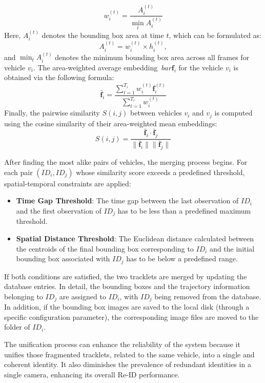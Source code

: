 \begin{itemize}
    \[
        w_{i}^{(t)} = \frac{A_{i}^{(t)}}{\min\limits_{t} A_{i}^{(t)}}
    \]
    Here, \( A_{i}^{(t)} \) denotes the bounding box area at time \( t \), which can be formulated as:
    \[
        A_{i}^{(t)} = w_{i}^{(t)} \times h_{i}^{(t)},
    \]
    and \( \min_{t} A_{i}^{(t)} \) denotes the minimum bounding box area across all frames for vehicle \( v_i \).
    The area-weighted average embedding \(\ bar{\mathbf{f}}_{i} \) for the vehicle \( v_i \) is obtained via the following formula:
    \[
        \bar{\mathbf{f}}_{i} = \frac{\sum_{t=1}^{T_i} w_{i}^{(t)} \mathbf{f}_{i}^{(t)}}{\sum_{t=1}^{T_i} w_{i}^{(t)}}
    \]
    Finally, the pairwise similarity \( S(i, j) \) between vehicles \( v_i \) and \( v_j \) is computed using the cosine similarity of their area-weighted mean embeddings:
    \[
        S(i, j) = \frac{\bar{\mathbf{f}}_{i} \cdot \bar{\mathbf{f}}_{j}}{\|\bar{\mathbf{f}}_{i}\| \|\bar{\mathbf{f}}_{j}\|}
    \]
\end{itemize}

After finding the most alike pairs of vehicles, the merging process begins. For each pair $(ID_i, ID_j)$ whose similarity score exceeds a predefined threshold, spatial-temporal constraints are applied:
\begin{itemize}
    \item \textbf{Time Gap Threshold}: The time gap between the last observation of $ID_i$ and the first observation of $ID_j$ has to be less than a predefined maximum threshold.
    \item \textbf{Spatial Distance Threshold}: The Euclidean distance calculated between the centroids of the final bounding box corresponding to $ID_i$ and the initial bounding box associated with $ID_j$ has to be below a predefined range.
\end{itemize}

If both conditions are satisfied, the two tracklets are merged by updating the database entries. In detail, the bounding boxes and the trajectory information belonging to $ID_j$ are assigned to $ID_i$, with $ID_j$ being removed from the database. In addition, if the bounding box images are saved to the local disk (through a specific configuration parameter), the corresponding image files are moved to the folder of $ID_i$.

The unification process can enhance the reliability of the system because it unifies those fragmented tracklets, related to the same vehicle, into a single and coherent identity. It also diminishes the prevalence of redundant identities in a single camera, enhancing its overall Re-ID performance.

